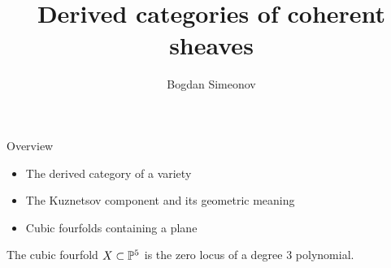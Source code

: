 \documentclass[10pt]{beamer}
\title{Derived categories of coherent sheaves}
\date{}
\author{Bogdan Simeonov}
\begin{document}
\maketitle

\begin{frame}{Overview}
    \begin{itemize}
        \pause
        \item The derived category of a variety \pause
        \item The Kuznetsov component and its geometric meaning \pause
        \item Cubic fourfolds containing a plane 
    \end{itemize}
 
\end{frame}

\begin{frame}[fragile]{The cubic fourfold}
    $X\subset \P^5$ is the zero locus of a degree $3$ polynomial.  \pause


\end{frame}
\end{document}
